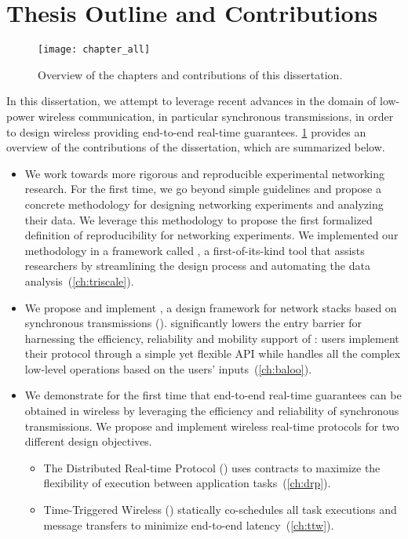 \pagebreak
\section{Thesis Outline and Contributions}

\begin{figure}
  \centering
  \texttt{[image: chapter\_all]}
  \caption{Overview of the chapters and contributions of this dissertation.}
  \label{fig:chapter_all}
\end{figure}

In this dissertation, we attempt to leverage recent advances in the domain of low-power wireless communication, in particular synchronous transmissions, in order to design wireless \CPS providing end-to-end real-time guarantees.
\cref{fig:chapter_all} provides an overview of the contributions of the dissertation, which are summarized below.
\begin{itemize}

  \item
  We work towards more rigorous and reproducible experimental networking research.
  For the first time, we go beyond simple guidelines and propose a concrete methodology for designing networking experiments and analyzing their data.
  We leverage this methodology to propose the first formalized definition of reproducibility for networking experiments.
  We implemented our methodology in a framework called \triscale, a first-of-its-kind tool that assists researchers by streamlining the design process and automating the data analysis~(\cref{ch:triscale}).

  \item
  We propose and implement \baloo, a design framework for network stacks based on synchronous transmissions (\ST).
  \baloo significantly lowers the entry barrier for harnessing the efficiency, reliability and mobility support of \ST:
  users implement their protocol through a simple yet flexible API while \baloo handles all the complex low-level operations based on the users' inputs~(\cref{ch:baloo}).

  \item
  We demonstrate for the first time that end-to-end real-time guarantees can be obtained in wireless \CPS by leveraging the efficiency and reliability of synchronous transmissions.
  We propose and implement wireless real-time protocols for two different design objectives.
  \begin{itemize}
    \item The Distributed Real-time Protocol (\DRP) uses contracts to maximize the flexibility of execution between application tasks~(\cref{ch:drp}).
    \item Time-Triggered Wireless (\TTW) statically co-schedules all task executions and message transfers to minimize end-to-end latency~(\cref{ch:ttw}).
  \end{itemize}

\end{itemize}



